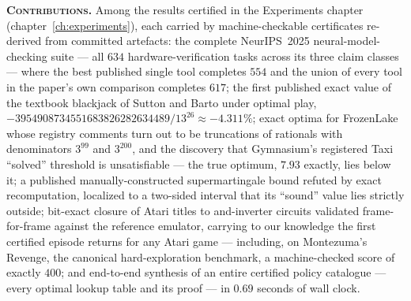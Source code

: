 \documentclass[10pt,a4paper,oneside]{book}
\theoremstyle{definition}
\theoremstyle{plain}
\theoremstyle{remark}
\theoremstyle{definition}
\begin{document}
\frontmatter
{}
\maitriatitlepage
\setcounter{page}{2}

\clearpage
\thispagestyle{empty}
\noindent\textbf{\textsc{Contributions.}} Among the results certified in
the Experiments chapter (chapter~\ref{ch:experiments}), each carried by
machine-checkable certificates re-derived from committed artefacts: the
complete NeurIPS~2025 neural-model-checking suite --- all $634$
hardware-verification tasks across its three claim classes --- where the
best published single tool completes $554$ and the union of every tool
in the paper's own comparison completes $617$; the first published exact
value of the textbook blackjack of Sutton and Barto under optimal play,
$-3954908734551683826282634489/13^{26} \approx -4.311\%$; exact optima
for FrozenLake whose registry comments turn out to be truncations of
rationals with denominators $3^{99}$ and $3^{200}$, and the discovery
that Gymnasium's registered Taxi ``solved'' threshold is unsatisfiable
--- the true optimum, $7.93$ exactly, lies below it; a published
manually-constructed supermartingale bound refuted by exact
recomputation, localized to a two-sided interval that its ``sound''
value lies strictly outside; bit-exact closure of Atari titles to
and-inverter circuits validated frame-for-frame against the reference
emulator, carrying to our knowledge the first certified episode
returns for any Atari game --- including, on Montezuma's Revenge, the
canonical hard-exploration benchmark, a machine-checked score of
exactly $400$; and end-to-end synthesis of an
entire certified policy catalogue --- every optimal lookup table and its
proof --- in $0.69$ seconds of wall clock.\par\medskip
\end{document}
